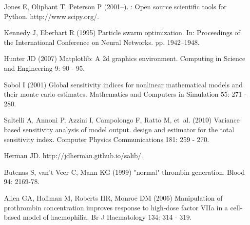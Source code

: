 \documentclass[processes,article,received,moreauthors,pdftex,12pt,a4paper]{mdpi}
\begin{document}
\begin{thebibliography}{9999}
Jones E, Oliphant T, Peterson P (2001--).
: Open source scientific tools for {Python}.
\newblock http://www.scipy.org/.

Kennedy J, Eberhart R (1995) Particle swarm optimization.
\newblock In: Proceedings of the International Conference on Neural Networks.
  pp. 1942--1948.

Hunter JD (2007) Matplotlib: A 2d graphics environment.
\newblock Computing in Science and Engineering 9: 90 - 95.

Sobol I (2001) Global sensitivity indices for nonlinear mathematical models and
  their monte carlo estimates.
\newblock Mathematics and Computers in Simulation 55: 271 - 280.

Saltelli A, Annoni P, Azzini I, Campolongo F, Ratto M, et~al. (2010) Variance
  based sensitivity analysis of model output. design and estimator for the
  total sensitivity index.
\newblock Computer Physics Communications 181: 259 - 270.

Herman JD.
\newblock http://jdherman.github.io/salib/.

Butenas S, van't Veer C, Mann KG (1999) "normal" thrombin generation.
\newblock Blood 94: 2169-78.

Allen GA, Hoffman M, Roberts HR, Monroe DM (2006) Manipulation of prothrombin
  concentration improves response to high-dose factor {VIIa} in a cell-based
  model of haemophilia.
\newblock Br J Haematology 134: 314 - 319.

\end{thebibliography}



\end{document}
